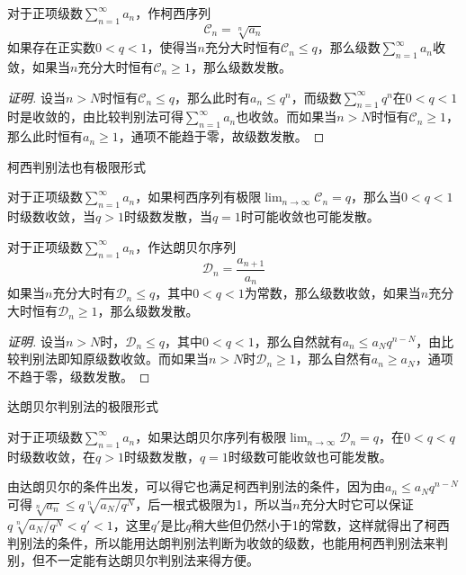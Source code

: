 \begin{theorem}[柯西判别法]
  对于正项级数$\sum_{n=1}^{\infty}a_n$，作柯西序列
  \[ \mathcal{C}_n = \sqrt[n]{a_n} \]
  如果存在正实数$0<q<1$，使得当$n$充分大时恒有$\mathcal{C}_n \leqslant q$，那么级数$\sum_{n=1}^{\infty}a_n$收敛，如果当$n$充分大时恒有$\mathcal{C}_n \geqslant 1$，那么级数发散。
\end{theorem}

\begin{proof}[证明]
  设当$n>N$时恒有$\mathcal{C}_n \leqslant q$，那么此时有$a_n \leqslant q^n$，而级数$\sum_{n=1}^{\infty}q^n$在$0<q<1$时是收敛的，由比较判别法可得$\sum_{n=1}^{\infty}a_n$也收敛。而如果当$n>N$时恒有$\mathcal{C}_n \geqslant 1$，那么此时恒有$a_n \geqslant 1$，通项不能趋于零，故级数发散。
\end{proof}

柯西判别法也有极限形式
\begin{inference}
  对于正项级数$\sum_{n=1}^{\infty}a_n$，如果柯西序列有极限$\lim_{n \to \infty} \mathcal{C}_n=q$，那么当$0<q<1$时级数收敛，当$q>1$时级数发散，当$q=1$时可能收敛也可能发散。
\end{inference}

\begin{theorem}[达朗贝尔判别法]
  对于正项级数$\sum_{n=1}^{\infty}a_n$，作达朗贝尔序列
  \[ \mathcal{D}_n = \frac{a_{n+1}}{a_n} \]
  如果当$n$充分大时有$\mathcal{D}_n \leqslant q$，其中$0<q<1$为常数，那么级数收敛，如果当$n$充分大时恒有$\mathcal{D}_n \geqslant 1$，那么级数发散。
\end{theorem}

\begin{proof}[证明]
  设当$n>N$时，$\mathcal{D}_n \leqslant q$，其中$0<q<1$，那么自然就有$a_n \leqslant a_N q^{n-N}$，由比较判别法即知原级数收敛。而如果当$n>N$时$\mathcal{D}_n \geqslant 1$，那么自然有$a_n \geqslant a_N$，通项不趋于零，级数发散。
\end{proof}

达朗贝尔判别法的极限形式
\begin{inference}
  对于正项级数$\sum_{n=1}^{\infty}a_n$，如果达朗贝尔序列有极限$\lim_{n \to \infty} \mathcal{D}_n = q$，在$0<q<q$时级数收敛，在$q>1$时级数发散，$q=1$时级数可能收敛也可能发散。
\end{inference}

由达朗贝尔的条件出发，可以得它也满足柯西判别法的条件，因为由$a_n \leqslant a_N q^{n-N}$可得$\sqrt[n]{a_n} \leqslant q \sqrt[n]{a_N/q^N}$，后一根式极限为1，所以当$n$充分大时它可以保证$q \sqrt[n]{a_N/q^N}<q'<1$，这里$q'$是比$q$稍大些但仍然小于1的常数，这样就得出了柯西判别法的条件，所以能用达朗判别法判断为收敛的级数，也能用柯西判别法来判别，但不一定能有达朗贝尔判别法来得方便。

